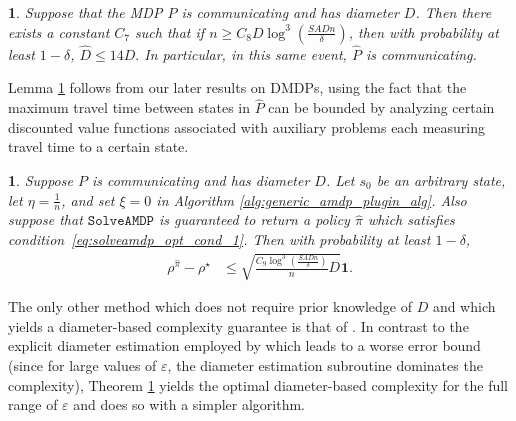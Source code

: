 \documentclass{article}
\theoremstyle{plain}
\theoremstyle{plain}
\newtheorem{lem}[thm]{\protect\lemmaname}
\theoremstyle{remark}
\theoremstyle{plain}
\newtheorem{cor}[thm]{\protect\corollaryname}
\theoremstyle{plain}
\providecommand{\corollaryname}{Corollary}
\providecommand{\lemmaname}{Lemma}
\newcommand{\Phat}{\widehat{P}}
\newcommand{\one}{\mathbf{1}}
\newcommand{\pihat}{\widehat{\pi}}
\newcommand{\SolveAMDP}{\texttt{SolveAMDP}}
\begin{document}
\begin{lem}
\label{lem:empirical_diameter_bound}
Suppose that the MDP $P$ is communicating and has diameter $D$. Then there exists a constant $C_7$ such that if $n \geq C_8 D \log^3 \left(\frac{SADn}{\delta} \right)$, then with probability at least $1-\delta$,
$\widehat{D} \leq 14 D.$
In particular, in this same event, $\Phat$ is communicating.
\end{lem}
Lemma \ref{lem:empirical_diameter_bound} follows from our later results on DMDPs, using the fact that the maximum travel time between states in $\Phat$ can be bounded by analyzing certain discounted value functions associated with auxiliary problems each measuring travel time to a certain state.
\begin{cor}
\label{thm:diameter_complexity}
    Suppose $P$ is communicating and has diameter $D$. Let $s_0$ be an arbitrary state, let $\eta = \frac{1}{n}$, and set $\xi = 0$ in Algorithm \ref{alg:generic_amdp_plugin_alg}. Also suppose that $\SolveAMDP$ is guaranteed to return a policy $\pihat$ which satisfies condition~\eqref{eq:solveamdp_opt_cond_1}.
    Then with probability at least $1-\delta$,
    \begin{align*}
        \rho^{\pihat} - \rho^\star & \leq  \sqrt{\frac{C_9 \log^3 \left( \frac{SADn}{\delta} \right)}{n} D }\one.
    \end{align*}
\end{cor}
The only other method which does not require prior knowledge of $D$ and which yields a diameter-based complexity guarantee is that of \cite{tuynman_finding_2024}.
In contrast to the explicit diameter estimation employed by \cite{tuynman_finding_2024} which leads to a worse error bound (since for large values of $\varepsilon$, the diameter estimation subroutine dominates the complexity), Theorem \ref{thm:diameter_complexity} yields the optimal diameter-based complexity for the full range of $\varepsilon$ and does so with a simpler algorithm.
\end{document}
